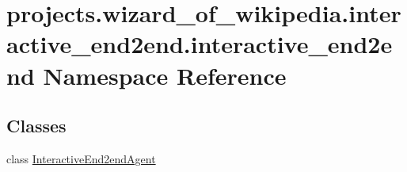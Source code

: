 \hypertarget{namespaceprojects_1_1wizard__of__wikipedia_1_1interactive__end2end_1_1interactive__end2end}{}\section{projects.\+wizard\+\_\+of\+\_\+wikipedia.\+interactive\+\_\+end2end.\+interactive\+\_\+end2end Namespace Reference}
\label{namespaceprojects_1_1wizard__of__wikipedia_1_1interactive__end2end_1_1interactive__end2end}
\subsection*{Classes}
\begin{DoxyCompactItemize}
\item 
class \hyperlink{classprojects_1_1wizard__of__wikipedia_1_1interactive__end2end_1_1interactive__end2end_1_1InteractiveEnd2endAgent}{Interactive\+End2end\+Agent}
\end{DoxyCompactItemize}
